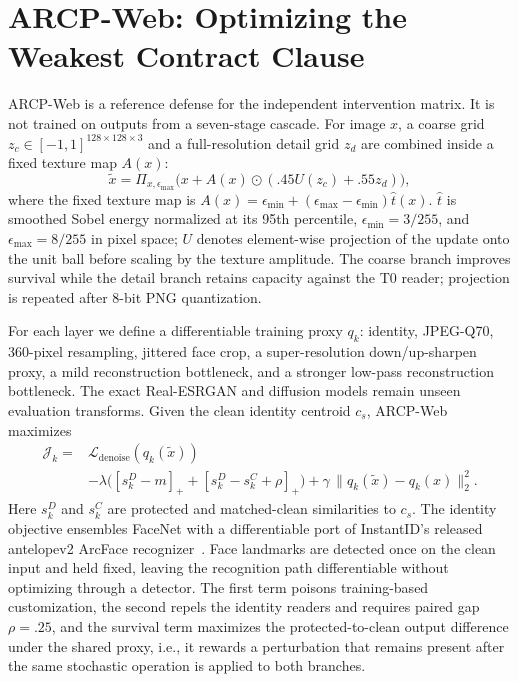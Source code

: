 \section{ARCP-Web: Optimizing the Weakest Contract Clause}
\label{sec:defense}

ARCP-Web is a reference defense for the independent intervention matrix. It is
not trained on outputs from a seven-stage cascade. For image $x$, a coarse grid
$z_c\in[-1,1]^{128\times128\times3}$ and a full-resolution detail grid $z_d$
are combined inside a fixed texture map $A(x)$:
\begin{equation}
\widetilde{x}=\Pi_{x,\epsilon_{\max}}\bigl(x+A(x)\odot(.45U(z_c)+.55z_d)\bigr),
\end{equation}
where the fixed texture map is
$A(x)=\epsilon_{\min}+(\epsilon_{\max}-\epsilon_{\min})\widehat{t}(x)$.
$\widehat{t}$ is smoothed Sobel energy normalized at its 95th percentile,
$\epsilon_{\min}=3/255$, and $\epsilon_{\max}=8/255$ in pixel space; $U$
denotes element-wise projection of the update onto the unit ball before
scaling by the texture amplitude. The coarse
branch improves survival while the detail branch retains capacity against the
T0 reader; projection is repeated after 8-bit PNG quantization.

For each layer we define a differentiable training proxy $q_k$: identity,
JPEG-Q70, 360-pixel resampling, jittered face crop, a super-resolution
down/up-sharpen proxy, a mild reconstruction bottleneck, and a stronger
low-pass reconstruction bottleneck. The exact Real-ESRGAN and diffusion models
remain unseen evaluation transforms. Given the clean identity centroid $c_s$,
ARCP-Web maximizes
\begin{equation}
\begin{split}
\mathcal{J}_k ={}& \mathcal{L}_{\mathrm{denoise}}(q_k(\widetilde{x}))\\
&-\lambda\bigl([s_k^D-m]_+ + [s_k^D-s_k^C+\rho]_+\bigr)
+\gamma\,\|q_k(\widetilde{x})-q_k(x)\|_2^2 .
\end{split}
\label{eq:arcpweb}
\end{equation}
Here $s_k^D$ and $s_k^C$ are protected and matched-clean similarities to $c_s$.
The identity objective ensembles FaceNet with a differentiable port of
InstantID's released antelopev2 ArcFace
recognizer~\cite{deng2018arcface}. Face landmarks are detected
once on the clean input and held fixed, leaving the recognition path
differentiable without optimizing through a detector. The first term poisons
training-based customization, the second repels the identity readers and
requires paired gap $\rho=.25$, and the survival term maximizes the
protected-to-clean output difference under the shared proxy, i.e., it rewards
a perturbation that remains present after the same stochastic operation is
applied to both branches.

